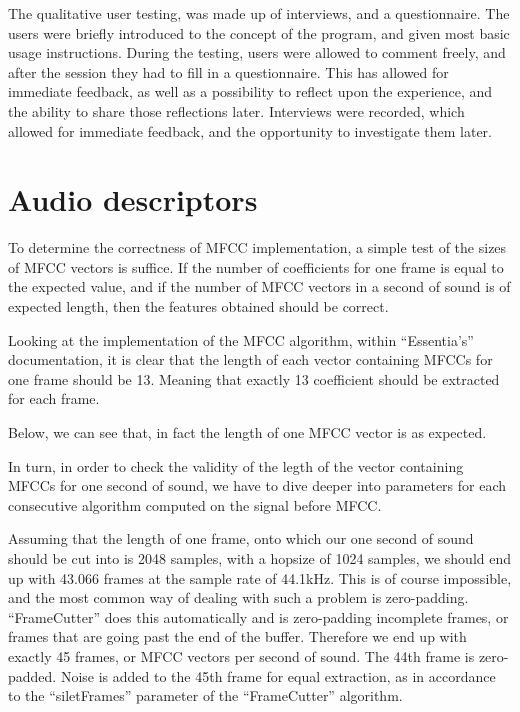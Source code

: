 The qualitative user testing, was made up of interviews, and a
questionnaire. The users were briefly introduced to the concept of the
program, and given most basic usage instructions. During the testing,
users were allowed to comment freely, and after the session they had
to fill in a questionnaire. This has allowed for immediate feedback,
as well as a possibility to reflect upon the experience, and the
ability to share those reflections later.  Interviews were recorded,
which allowed for immediate feedback, and the opportunity to
investigate them later.

\section{Audio descriptors}
To determine the correctness of MFCC implementation, a simple test of
the sizes of MFCC vectors is suffice. If the number of coefficients
for one frame is equal to the expected value, and if the number of
MFCC vectors in a second of sound is of expected length, then the
features obtained should be correct.

Looking at the implementation of the MFCC algorithm, within
``Essentia's'' documentation, it is clear that the length of each
vector containing MFCCs for one frame should be 13. Meaning that
exactly 13 coefficient should be extracted for each frame.

Below, we can see that, in fact the length of one MFCC vector is as expected.


In turn, in order to check the validity of the legth of the vector
containing MFCCs for one second of sound, we have to dive deeper into
parameters for each consecutive algorithm computed on the signal
before MFCC.

Assuming that the length of one frame, onto which our one second of
sound should be cut into is 2048 samples, with a hopsize of 1024
samples, we should end up with 43.066 frames at the sample rate of
44.1kHz. This is of course impossible, and the most common way of
dealing with such a problem is zero-padding. ``FrameCutter'' does this
automatically and is zero-padding incomplete frames, or frames that
are going past the end of the buffer. Therefore we end up with exactly
45 frames, or MFCC vectors per second of sound. The 44th frame is
zero-padded. Noise is added to the 45th frame for equal extraction, as
in accordance to the ``siletFrames'' parameter of the ``FrameCutter''
algorithm.

